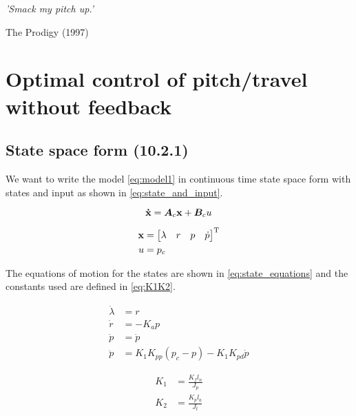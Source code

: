 \epigraph{\textit{'Smack my pitch up.'}}{The Prodigy (1997)}

\section{Optimal control of pitch/travel without feedback}

\subsection{State space form (10.2.1)}
We want to write the model \eqref{eq:model1} in continuous time state space form with states and input as shown in \eqref{eq:state_and_input}.

\begin{equation}\label{eq:model1}
	\mathbf{\dot{x}} = \bm{A}_{c}\mathbf{x} + \bm{B}_{c}u
\end{equation}

\begin{subequations}\label{eq:state_and_input}
\begin{align}
	\mathbf{x} 	&= \begin{bmatrix}\lambda & r & p & \dot{p} \end{bmatrix}^{\text{T}} \\
	u 		&= p_{c}
\end{align}
\end{subequations}

The equations of motion for the states are shown in \eqref{eq:state_equations} and the constants used are defined in \eqref{eq:K1K2}.

\begin{subequations}\label{eq:state_equations}
\begin{align}
	\dot{\lambda} 	&= r \\
	\dot{r} 		&= - K_{a} p \\
	\dot{p} 		&= \dot{p} \\
	\ddot{p} 		&= K_{1} K_{pp} (p_{c} - p) - K_{1} K_{pd} \dot{p}
\end{align}
\end{subequations}

\begin{subequations}\label{eq:K1K2}
\begin{align}
	K_{1} &= \frac{K_{f} l_{n}}{J_{p}} \\
	K_{2} &= \frac{K_{p} l_{a}}{J_{t}}
\end{align}
\end{subequations}


